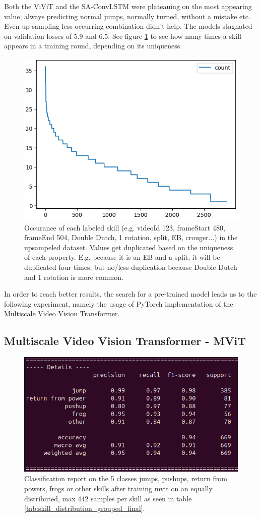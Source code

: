Both the ViViT and the SA-ConvLSTM were plateauing on the most appearing value, always predicting normal jumps, normally turned, without a mistake etc.
Even up-sampling less occurring combination didn't help. The models stagnated on validation losses of 5.9 and 6.5. See figure \ref{fig:skill-upsampling-distribution} to see how many times a skill appears in a training round, depending on its uniqueness.

\begin{figure}
    \centering
    \includegraphics[width=0.7\linewidth]{img/skill-upsampling-distribution}
    \caption[upsampling distribution of skills]{Occurance of each labeled skill (e.g. videoId 123, frameStart 480, frameEnd 504, Double Dutch, 1 rotation, split, EB, crouger...) in the upsampeled dataset. Values get duplicated based on the uniqueness of each property. E.g. because it is an EB and a split, it will be duplicated four times, but no/less duplication because Double Dutch and 1 rotation is more common.}
    \label{fig:skill-upsampling-distribution}
\end{figure}

In order to reach better results, the search for a pre-trained model leads us to the following experiment, namely the usage of PyTorch implementation of the Multiscale Video Vision Transformer.

\subsection{Multiscale Video Vision Transformer - MViT}


\begin{figure}
    \centering
    \includegraphics[width=0.7\linewidth]{img/mvit-5-classes}
    \caption[Classification report on only 5 skill classes]{Classification report on the 5 classes jumps, pushups, return from powers, frogs or other skills after training mvit on an equally distributed, max 442 samples per skill as seen in table \ref{tab:skill_distribution_grouped_final}.}
    \label{fig:mvit-5-classes}
\end{figure}


